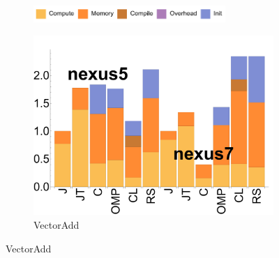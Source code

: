 % 
% 
% 


\begin{figure}[ht]
  \centering

  \begin{subfigure}[b]{0.5\textwidth}
          \centering
          \includegraphics[width=0.8\textwidth]{data/legend.pdf}
  \end{subfigure}

  \begin{subfigure}[b]{0.25\textwidth}
      \centering
      \includegraphics[width=\textwidth]{data/bbattery_vectoradd.pdf}
      \caption{VectorAdd}\label{fig:b_vectoradd}
  \end{subfigure}%


\end{figure}
